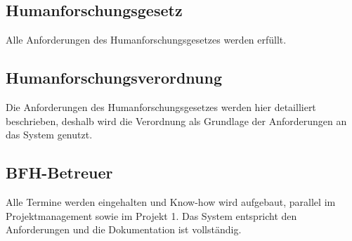 \subsection{Humanforschungsgesetz}
Alle Anforderungen des Humanforschungsgesetzes werden erfüllt.

\subsection{Humanforschungsverordnung}
Die Anforderungen des Humanforschungsgesetzes werden hier detailliert beschrieben, deshalb wird die Verordnung als Grundlage der Anforderungen an das System genutzt.

\subsection{BFH-Betreuer}
Alle Termine werden eingehalten und Know-how wird aufgebaut, parallel im Projektmanagement sowie im Projekt 1. Das System entspricht den Anforderungen und die Dokumentation ist vollständig.

